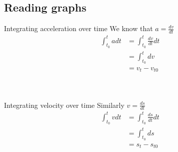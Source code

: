 \subsection{Reading graphs }


\begin{frame}{Integrating acceleration over time}
\small
We know that $a = \frac{dv}{dt}$\\

\begin{equation}\nonumber
\begin{split}
\displaystyle \int_{t_0}^{t} a dt  & = \displaystyle\int_{t_0}^{t} \frac{dv}{dt} dt\\
  & = \displaystyle \int_{t_0}^{t} dv \\
  & = v_{t} - v_{t0} \\
\end{split}
\end{equation}

  \\[1ex]



\end{frame}


\begin{frame}{Integrating velocity over time}
\small
Similarly $v = \frac{ds}{dt}$\\

\begin{equation}\nonumber
\begin{split}
\displaystyle \int_{t_0}^{t} v dt  & = \displaystyle\int_{t_0}^{t} \frac{ds}{dt} dt\\
  & = \displaystyle \int_{t_0}^{t} ds \\
  & = s_{t} - s_{t0} \\
\end{split}
\end{equation}

  \\[1ex]

\end{frame}

